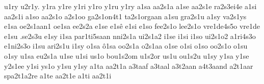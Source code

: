 {u1ry
u2r1y.
%
y1ra
y1re
y1ri
y1ro
y1ru
y1ry
%
%
a1sa
aa2s1a
a1se
aa2s1e
ra2s3ei4e
a1si
aa2s1i
a1so
aa2s1o
a2s1oo
ga2s1on4t1
ta2s1orgaan
a1su
gra2s1u
a1sy
va2s1ys
%
e1sa
oe2s1aan1
oe1sa
ee2s2a
e1se
e1sê
e1si
e1so
fee2s1o
lee2s1o
vre1de4s5o
vre1de
e1su
.se2s3u
e1sy
%
i1sa
par1ti5saan
nni2s1a
ui2s1a2
i1se
i1si
i1so
ui2s1o2
a1ri4s3o
e1ni2s3o
i1su
ari2s1u
i1sy
%
o1sa
ô1sa
oo2s1a
o2s1aa
o1se
o1si
o1so
oo2s1o
o1su
o1sy
%
u1sa
eu2s1a
u1se
u1si
us1o
bou1s2om
u1s2or
us1u
ou1s2u
u1sy
%
y1sa
y1se
y2s1ee
y1si
ys1o
y1su
y1sy
%
%
%
%
a1ta
aa2t1a
a3taaf
a3taal
a3t2aan
a4t3aand
a2t1aar
spa2t1a2re
a1te
aa2t1e
a1ti
aa2t1i
}
